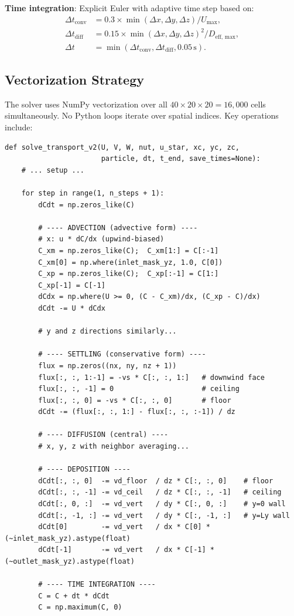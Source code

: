 \documentclass[12pt]{article}
\begin{document}
\textbf{Time integration}: Explicit Euler with adaptive time step based on:
\begin{align}
    \Delta t_\text{conv} &= 0.3 \times \min(\Delta x, \Delta y, \Delta z) / U_\text{max}, \\
    \Delta t_\text{diff} &= 0.15 \times \min(\Delta x, \Delta y, \Delta z)^2 / D_\text{eff, max}, \\
    \Delta t &= \min(\Delta t_\text{conv}, \Delta t_\text{diff}, 0.05\,\text{s}).
\end{align}

\subsection{Vectorization Strategy}

The solver uses NumPy vectorization over all $40 \times 20 \times 20 = 16{,}000$ cells simultaneously. No Python loops iterate over spatial indices. Key operations include:

\begin{lstlisting}[style=python, caption={Key structure of \texttt{solve\_transport\_v2}}]
def solve_transport_v2(U, V, W, nut, u_star, xc, yc, zc,
                       particle, dt, t_end, save_times=None):
    # ... setup ...

    for step in range(1, n_steps + 1):
        dCdt = np.zeros_like(C)

        # ---- ADVECTION (advective form) ----
        # x: u * dC/dx (upwind-biased)
        C_xm = np.zeros_like(C);  C_xm[1:] = C[:-1]
        C_xm[0] = np.where(inlet_mask_yz, 1.0, C[0])
        C_xp = np.zeros_like(C);  C_xp[:-1] = C[1:]
        C_xp[-1] = C[-1]
        dCdx = np.where(U >= 0, (C - C_xm)/dx, (C_xp - C)/dx)
        dCdt -= U * dCdx

        # y and z directions similarly...

        # ---- SETTLING (conservative form) ----
        flux = np.zeros((nx, ny, nz + 1))
        flux[:, :, 1:-1] = -vs * C[:, :, 1:]   # downwind face
        flux[:, :, -1] = 0                     # ceiling
        flux[:, :, 0] = -vs * C[:, :, 0]       # floor
        dCdt -= (flux[:, :, 1:] - flux[:, :, :-1]) / dz

        # ---- DIFFUSION (central) ----
        # x, y, z with neighbor averaging...

        # ---- DEPOSITION ----
        dCdt[:, :, 0]  -= vd_floor  / dz * C[:, :, 0]    # floor
        dCdt[:, :, -1] -= vd_ceil   / dz * C[:, :, -1]   # ceiling
        dCdt[:, 0, :]  -= vd_vert   / dy * C[:, 0, :]    # y=0 wall
        dCdt[:, -1, :] -= vd_vert   / dy * C[:, -1, :]   # y=Ly wall
        dCdt[0]        -= vd_vert   / dx * C[0] * (~inlet_mask_yz).astype(float)
        dCdt[-1]       -= vd_vert   / dx * C[-1] * (~outlet_mask_yz).astype(float)

        # ---- TIME INTEGRATION ----
        C = C + dt * dCdt
        C = np.maximum(C, 0)
\end{lstlisting}
\end{document}

